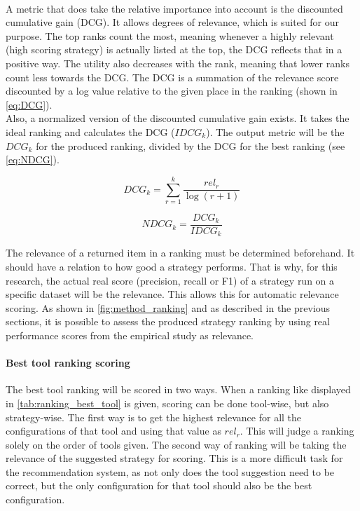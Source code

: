 ~\\A metric that does take the relative importance into account is the discounted cumulative gain (DCG). It allows degrees of relevance, which is suited for our purpose. The top ranks count the most, meaning whenever a highly relevant (high scoring strategy) is actually listed at the top, the DCG reflects that in a positive way. The utility also decreases with the rank, meaning that lower ranks count less towards the DCG. The DCG is a summation of the relevance score discounted by a log value relative to the given place in the ranking (shown in \autoref{eq:DCG}).
~\\Also, a normalized version of the discounted cumulative gain exists. It takes the ideal ranking and calculates the DCG ($IDCG_k$). The output metric will be the $DCG_k$ for the produced ranking, divided by the DCG for the best ranking (see \autoref{eq:NDCG}). 

\begin{equation}
\label{eq:DCG}
    DCG_k = \sum^k_{r=1} \frac{rel_r}{\log(r+1)}
\end{equation}

\begin{equation}
\label{eq:NDCG}
    NDCG_k = \frac{DCG_k}{IDCG_k}
\end{equation}

The relevance of a returned item in a ranking must be determined beforehand. It should have a relation to how good a strategy performs. 
That is why, for this research, the actual real score (precision, recall or F1) of a strategy run on a specific dataset will be the relevance. This allows this for automatic relevance scoring. As shown in \autoref{fig:method_ranking} and as described in the previous sections, it is possible to assess the produced strategy ranking by using real performance scores from the empirical study as relevance.


\paragraph{Best tool ranking scoring} The best tool ranking will be scored in two ways. When a ranking like displayed in \autoref{tab:ranking_best_tool} is given, scoring can be done tool-wise, but also strategy-wise. The first way is to get the highest relevance for all the configurations of that tool and using that value as $rel_r$. This will judge a ranking solely on the order of tools given. The second way of ranking will be taking the relevance of the suggested strategy for scoring. This is a more difficult task for the recommendation system, as not only does the tool suggestion need to be correct, but the only configuration for that tool should also be the best configuration. 

